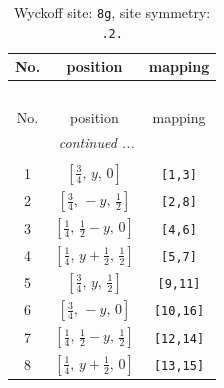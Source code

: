 \documentclass[fleqn,8pt]{jsarticle}
\begin{document}
\begin{longtable}{ccc}
\caption{Wyckoff site: {\tt 8g}, site symmetry: {\tt .2.}}
 \\
 \hline \hline
No. & position & mapping \\ \hline \endfirsthead

\multicolumn{2}{l}{\tablename\ \thetable{}} \\
 \hline \hline
No. & position & mapping \\ \hline \endhead

 \hline \hline
\multicolumn{2}{r}{\footnotesize\it continued ...} \\ \endfoot

 \hline \hline
\multicolumn{2}{r}{} \\ \endlastfoot

1 & $\left[ \frac{3}{4},\, y,\, 0 \right]$ & {\tt [1,3]} \\ \hline
2 & $\left[ \frac{3}{4},\, - y,\, \frac{1}{2} \right]$ & {\tt [2,8]} \\ \hline
3 & $\left[ \frac{1}{4},\, \frac{1}{2} - y,\, 0 \right]$ & {\tt [4,6]} \\ \hline
4 & $\left[ \frac{1}{4},\, y + \frac{1}{2},\, \frac{1}{2} \right]$ & {\tt [5,7]} \\ \hline
5 & $\left[ \frac{3}{4},\, y,\, \frac{1}{2} \right]$ & {\tt [9,11]} \\ \hline
6 & $\left[ \frac{3}{4},\, - y,\, 0 \right]$ & {\tt [10,16]} \\ \hline
7 & $\left[ \frac{1}{4},\, \frac{1}{2} - y,\, \frac{1}{2} \right]$ & {\tt [12,14]} \\ \hline
8 & $\left[ \frac{1}{4},\, y + \frac{1}{2},\, 0 \right]$ & {\tt [13,15]} \\
\end{longtable}
\renewcommand{\arraystretch}{1.2}
\end{document}
